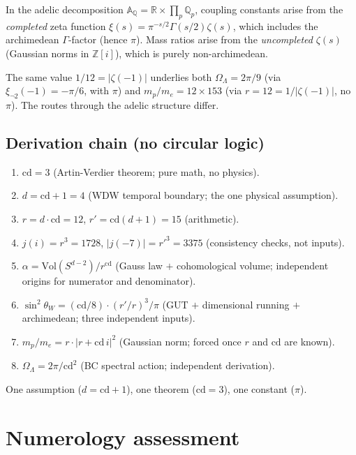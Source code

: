 \documentclass[aps,prl,twocolumn,superscriptaddress,nofootinbib]{revtex4-2}
\newcommand{\cd}{\mathrm{cd}}
\newcommand{\Z}{\mathbb{Z}}
\newcommand{\Q}{\mathbb{Q}}
\begin{document}
In the adelic decomposition
$\mathbb{A}_\Q = \mathbb{R} \times \prod_p \Q_p$,
coupling constants arise from the \emph{completed} zeta function
$\xi(s) = \pi^{-s/2}\Gamma(s/2)\zeta(s)$,
which includes the archimedean $\Gamma$-factor (hence $\pi$).
Mass ratios arise from the \emph{uncompleted} $\zeta(s)$
(Gaussian norms in $\Z[i]$), which is purely non-archimedean.

The same value $1/12 = |\zeta(-1)|$ underlies both
$\Omega_\Lambda = 2\pi/9$ (via $\xi_{\neg 2}(-1) = -\pi/6$, with $\pi$)
and $m_p/m_e = 12 \times 153$ (via $r = 12 = 1/|\zeta(-1)|$, no $\pi$).
The routes through the adelic structure differ.

\subsection{Derivation chain (no circular logic)}

\begin{enumerate}
\item $\cd = 3$ (Artin-Verdier theorem; pure math, no physics).
\item $d = \cd + 1 = 4$ (WDW temporal boundary; the one physical assumption).
\item $r = d \cdot \cd = 12$, $r' = \cd(d+1) = 15$ (arithmetic).
\item $j(i) = r^3 = 1728$, $|j(-7)| = {r'}^3 = 3375$ (consistency checks,
  not inputs).
\item $\alpha = \mathrm{Vol}(S^{d-2})/r^{\cd}$ (Gauss law $+$ cohomological
  volume; independent origins for numerator and denominator).
\item $\sin^2\theta_W = (\cd/8) \cdot (r'/r)^3 / \pi$
  (GUT $+$ dimensional running $+$ archimedean; three independent inputs).
\item $m_p/m_e = r \cdot |r + \cd\,i|^2$ (Gaussian norm; forced once $r$
  and $\cd$ are known).
\item $\Omega_\Lambda = 2\pi/\cd^2$ (BC spectral action; independent derivation).
\end{enumerate}

One assumption ($d = \cd + 1$), one theorem ($\cd = 3$), one constant ($\pi$).

\section{Numerology assessment}
\end{document}
